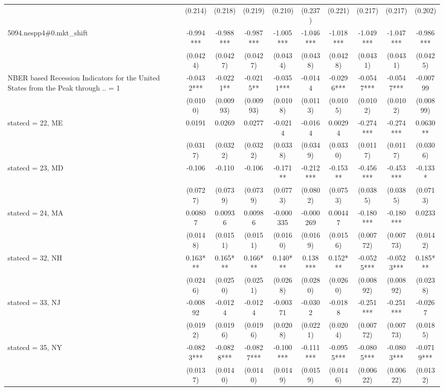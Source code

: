 \begin{tabular}{lccccccccc}
 & (0.214) & (0.218) & (0.219) & (0.210) & (0.237) & (0.221) & (0.217) & (0.217) & (0.202) \\
5094.nespp4\#0.mkt\_shift & -0.994*** & -0.988*** & -0.987*** & -1.005*** & -1.046*** & -1.018*** & -1.049*** & -1.047*** & -0.986*** \\
 & (0.0424) & (0.0427) & (0.0427) & (0.0434) & (0.0438) & (0.0428) & (0.0431) & (0.0431) & (0.0425) \\
NBER based Recession Indicators for the United States from the Peak through .. = 1 & -0.0432*** & -0.0221** & -0.0215** & -0.0351*** & -0.0144 & -0.0296*** & -0.0547*** & -0.0547*** & -0.00799 \\
 & (0.0100) & (0.00993) & (0.00993) & (0.0108) & (0.0113) & (0.0105) & (0.0102) & (0.0102) & (0.00899) \\
statecd = 22, ME & 0.0191 & 0.0269 & 0.0277 & -0.0214 & -0.0164 & 0.00294 & -0.274*** & -0.274*** & 0.0630** \\
 & (0.0317) & (0.0322) & (0.0322) & (0.0338) & (0.0349) & (0.0330) & (0.0117) & (0.0117) & (0.0306) \\
statecd = 23, MD & -0.106 & -0.110 & -0.106 & -0.171** & -0.212*** & -0.153** & -0.456*** & -0.453*** & -0.133* \\
 & (0.0727) & (0.0739) & (0.0739) & (0.0773) & (0.0802) & (0.0753) & (0.0385) & (0.0385) & (0.0713) \\
statecd = 24, MA & 0.00807 & 0.00936 & 0.00986 & -0.000335 & -0.000269 & 0.00447 & -0.180*** & -0.180*** & 0.0233 \\
 & (0.0148) & (0.0151) & (0.0151) & (0.0160) & (0.0169) & (0.0156) & (0.00772) & (0.00773) & (0.0142) \\
statecd = 32, NH & 0.163*** & 0.165*** & 0.166*** & 0.140*** & 0.138*** & 0.152*** & -0.0525*** & -0.0523*** & 0.185*** \\
 & (0.0246) & (0.0250) & (0.0251) & (0.0268) & (0.0280) & (0.0260) & (0.00892) & (0.00892) & (0.0238) \\
statecd = 33, NJ & -0.00892 & -0.0124 & -0.0124 & -0.00371 & -0.0302 & -0.0188 & -0.251*** & -0.251*** & -0.0267 \\
 & (0.0192) & (0.0196) & (0.0196) & (0.0208) & (0.0221) & (0.0204) & (0.00772) & (0.00773) & (0.0185) \\
statecd = 35, NY & -0.0823*** & -0.0828*** & -0.0827*** & -0.100*** & -0.111*** & -0.0955*** & -0.0805*** & -0.0803*** & -0.0719*** \\
 & (0.0137) & (0.0140) & (0.0140) & (0.0149) & (0.0159) & (0.0146) & (0.00622) & (0.00622) & (0.0132) \\

\end{tabular}
